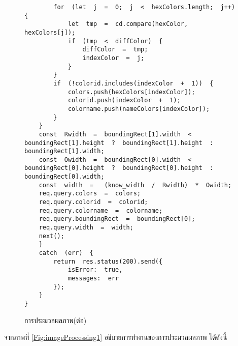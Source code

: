 	\begin{figure}[H]
		{\begin{lstlisting}
		for  (let  j  =  0;  j  <  hexColors.length;  j++)  {                    
			let  tmp  =  cd.compare(hexColor,  hexColors[j]);                    
			if  (tmp  <  diffColor)  {                        
				diffColor  =  tmp;                        
				indexColor  =  j;                    
			}                
		}                
		if  (!colorid.includes(indexColor  +  1))  {                    
			colors.push(hexColors[indexColor]);                    
			colorid.push(indexColor  +  1);                    
			colorname.push(nameColors[indexColor]);                
		}            
	}            
	const  Rwidth  =  boundingRect[1].width  <  boundingRect[1].height  ?  boundingRect[1].height  :  boundingRect[1].width;            
	const  Owidth  =  boundingRect[0].width  <  boundingRect[0].height  ?  boundingRect[0].height  :  boundingRect[0].width;            
	const  width  =   (know_width  /  Rwidth)  *  Owidth;            
	req.query.colors  =  colors;            
	req.query.colorid  =  colorid;            
	req.query.colorname  =  colorname;            
	req.query.boundingRect  =  boundingRect[0];            
	req.query.width  =  width;            
	next();        
	}   
	catch  (err)  {            
		return  res.status(200).send({                
			isError:  true,  
			messages:  err            
		});        
	}    
}   
	 	\end{lstlisting}}
		\caption{การประมวลผลภาพ(ต่อ)}
		\label{Fig:imageProcessing4}
	\end{figure}
	จากภาพที่ \ref{Fig:imageProcessing1} อธิบายการทำงานของการประมวลผลภาพ ได้ดังนี้
